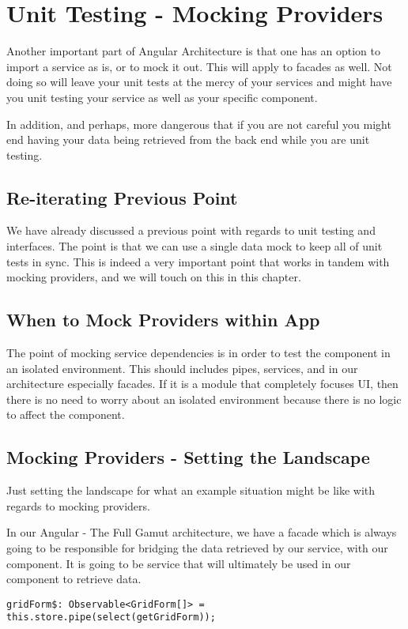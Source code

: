 \chapter{ Unit Testing - Mocking Providers }
Another important part of Angular Architecture is that one has an option to import a service as is, or to mock it out. This will apply to facades as well. Not doing so will leave your unit tests at the mercy of your services and might have you unit testing your service as well as your specific component. 

In addition, and perhaps, more dangerous that if you are not careful you might end having your data being retrieved from the back end while you are unit testing.

\section{ Re-iterating Previous Point }
We have already discussed a previous point with regards to unit testing and interfaces. The point is that we can use a single data mock to keep all of unit tests in sync. This is indeed a very important point that works in tandem with mocking providers, and we will touch on this in this chapter.

\section{ When to Mock Providers within App }
The point of mocking service dependencies is in order to test the component in an isolated environment. This should includes pipes, services, and in our architecture especially facades. If it is a module that completely focuses UI, then there is no need to worry about an isolated environment because there is no logic to affect the component.

\section{ Mocking Providers - Setting the Landscape }
Just setting the landscape for what an example situation might be like with regards to mocking providers.

In our Angular - The Full Gamut architecture, we have a facade which is always going to be responsible for bridging the data retrieved by our service, with our component. It is going to be service that will ultimately be used in our component to retrieve data.
\begin{lstlisting}
gridForm$: Observable<GridForm[]> = this.store.pipe(select(getGridForm));
\end{lstlisting}

